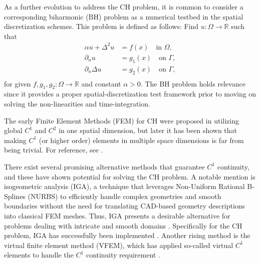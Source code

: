 \documentclass[11pt]{article}
\theoremstyle{remark}
\numberwithin{equation}{section}
\begin{document}
As a further evolution to address the CH problem, it is common to consider a corresponding biharmonic (BH) problem as a numerical testbed in the spatial discretization schemes. This problem is defined as follows: Find $u:\Omega \to \mathbb{R}   $
such that
\begin{equation}
\label{eq:BH-problem}
\begin{split}
    \alpha u + \Delta ^2 u  & = f( x) \quad \text{in }  \Omega, \\
    \partial _{n} u & = g_{1}( x)  \quad \text{on } \Gamma,   \\
    \partial _{n} \Delta  u & = g_{2}( x)  \quad \text{on } \Gamma,   \\
\end{split}
\end{equation}
for given $f,g_{1} ,g_{2}: \Omega  \to \mathbb{R} $ and constant $\alpha >0  $.
The BH problem holds relevance since it provides a proper spatial-discretization test framework prior to moving on solving the non-linearities and time-integration.

The early Finite Element Methods (FEM) for CH were proposed in \cite{elliott1987numerical, elliott1986cahn} utilizing global $C^{1}$ and $C^{2}$ in one spatial dimension, but later it has been shown that making $C^{1}$ (or higher order) elements in
multiple space dimensions is far from being trivial. For
reference, see \cite{kapl2021family, percell1976cubic, argyris1968tuba}.

There exist several promising alternative methods that guarantee $C^{1}$ continuity, and these have shown potential for solving the CH problem. A notable mention is isogeometric analysis (IGA), a technique that leverages Non-Uniform
Rational B-Splines (NURBS) to efficiently handle complex geometries and smooth boundaries without the need for translating CAD-based geometry descriptions into classical FEM meshes. Thus, IGA presents a desirable alternative for problems dealing with intricate and smooth domains
\cite{hughes2005isogeometric}. Specifically for the CH problem, IGA has successfully been implemented \cite{kastner2016isogeometric, gomez2008isogeometric}.
Another rising method is the virtual finite element method (VFEM), which has applied so-called virtual $C^{1}$ elements to handle the $C^{1}$ continuity requirement \cite{antonietti2016c}.
\end{document}
